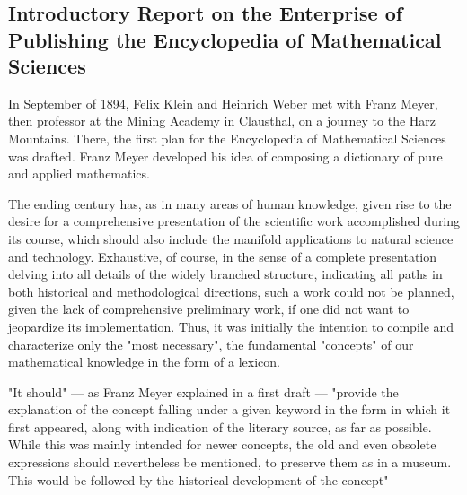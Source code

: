 \chapter*{}

\section*{Introductory Report on the Enterprise of Publishing the Encyclopedia of Mathematical Sciences}

In September of 1894, Felix Klein and Heinrich Weber met with Franz Meyer, then professor at the Mining Academy in Clausthal, on a journey to the Harz Mountains. There, the first plan for the Encyclopedia of Mathematical Sciences was drafted. Franz Meyer developed his idea of composing a dictionary of pure and applied mathematics.

The ending century has, as in many areas of human knowledge, given rise to the desire for a comprehensive presentation of the scientific work accomplished during its course, which should also include the manifold applications to natural science and technology. Exhaustive, of course, in the sense of a complete presentation delving into all details of the widely branched structure, indicating all paths in both historical and methodological directions, such a work could not be planned, given the lack of comprehensive preliminary work, if one did not want to jeopardize its implementation. Thus, it was initially the intention to compile and characterize only the "most necessary", the fundamental "concepts" of our mathematical knowledge in the form of a lexicon.

"It should" — as Franz Meyer explained in a first draft — "provide the explanation of the concept falling under a given keyword in the form in which it first appeared, along with indication of the literary source, as far as possible. While this was mainly intended for newer concepts, the old and even obsolete expressions should nevertheless be mentioned, to preserve them as in a museum. This would be followed by the historical development of the concept"
